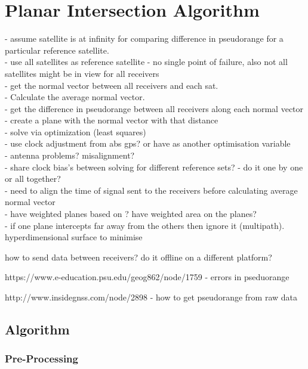 \section{Planar Intersection Algorithm}

- assume satellite is at infinity for comparing difference in pseudorange for a particular reference satellite.\\
- use all satellites as reference satellite - no single point of failure, also not all satellites might be in view for all receivers\\
- get the normal vector between all receivers and each sat. \\
- Calculate the average normal vector.\\
- get the difference in pseudorange between all receivers along each normal vector \\
- create a plane with the normal vector with that distance\\
- solve via optimization (least squares) \\
- use clock adjustment from abs gps? or have as another optimisation variable\\
- antenna problems? misalignment?\\
- share clock bias's between solving for different reference sets? - do it one by one or all together?\\
- need to align the time of signal sent to the receivers before calculating average normal vector\\

- have weighted planes based on ? have weighted area on the planes?\\
- if one plane intercepts far away from the others then ignore it (multipath). hyperdimensional surface to minimise




how to send data between receivers? do it offline on a different platform?


https://www.e-education.psu.edu/geog862/node/1759 - errors in pseduorange

http://www.insidegnss.com/node/2898 - how to get pseudorange from raw data




\subsection{Algorithm}

\subsubsection{Pre-Processing}

